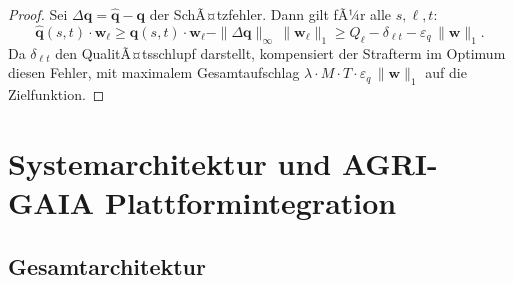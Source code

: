 ﻿\documentclass[12pt,a4paper]{article}
\theoremstyle{plain}
\theoremstyle{definition}
\begin{document}
	\begin{proof}
		Sei $\Delta\mathbf{q} = \hat{\mathbf{q}} - \mathbf{q}$ der
		SchÃ¤tzfehler. Dann gilt fÃ¼r alle $s, \ell, t$:
		\[
		\hat{\mathbf{q}}(s,t)\cdot\mathbf{w}_\ell \geq
		\mathbf{q}(s,t)\cdot\mathbf{w}_\ell -
		\|\Delta\mathbf{q}\|_\infty\,\|\mathbf{w}_\ell\|_1
		\geq Q_\ell - \delta_{\ell t} - \varepsilon_q\,\|\mathbf{w}\|_1.
		\]
		Da $\delta_{\ell t}$ den QualitÃ¤tsschlupf darstellt, kompensiert
		der Strafterm im Optimum diesen Fehler, mit maximalem Gesamtaufschlag
		$\lambda \cdot M \cdot T \cdot \varepsilon_q\,\|\mathbf{w}\|_1$
		auf die Zielfunktion.
	\end{proof}
	
	\section{Systemarchitektur und AGRI-GAIA Plattformintegration}
	
	\subsection{Gesamtarchitektur}
	
\end{document}
